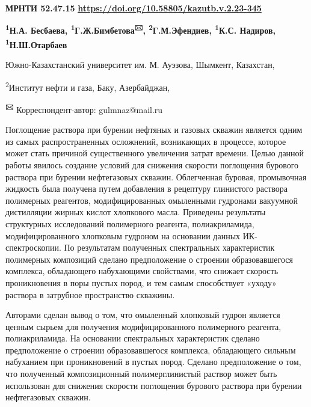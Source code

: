 \newpage
{\bfseries МРНТИ 52.47.15}
\hfill {\bfseries \href{https://doi.org/10.58805/kazutb.v.2.23-345}{https://doi.org/10.58805/kazutb.v.2.23-345}}


\begin{center}
{\bfseries \textsuperscript{1}Н.А. Бесбаева, \textsuperscript{1}Г.Ж.Бимбетова\textsuperscript{🖂}, \textsuperscript{2}Г.М.Эфендиев, \textsuperscript{1}К.С. Надиров, \textsuperscript{1}Н.Ш.Отарбаев}

Южно-Казахстанский университет им. М. Ауэзова, Шымкент, Казахстан,

\textsuperscript{2}Институт нефти и газа, Баку, Азербайджан,

{\bfseries \textsuperscript{🖂}} Корреспондент-автор: gulmnaz@mail.ru
\end{center}

Поглощение раствора при бурении нефтяных и газовых скважин является
одним из самых распространенных осложнений, возникающих в процессе,
которое может стать причиной существенного увеличения затрат времени.
Целью данной работы явилось создание условий для снижения скорости
поглощения бурового раствора при бурении нефтегазовых скважин.
Облегченная буровая, промывочная жидкость была получена путем добавления
в рецептуру глинистого раствора полимерных реагентов, модифицированных
омыленными гудронами вакуумной дистилляции жирных кислот хлопкового
масла. Приведены результаты структурных исследований полимерного
реагента, полиакриламида, модифицированного хлопковым гудроном на
основании данных ИК-спектроскопии. По результатам полученных
спектральных характеристик полимерных композиций сделано предположение о
строении образовавшегося комплекса, обладающего набухающими свойствами,
что снижает скорость проникновения в поры пустых пород, и тем самым
способствует «уходу» раствора в затрубное пространство скважины.

Авторами сделан вывод о том, что омыленный хлопковый гудрон является
ценным сырьем для получения модифицированного полимерного реагента,
полиакриламида. На основании спектральных характеристик сделано
предположение о строении образовавшегося комплекса, обладающего сильным
набуханием при проникновений в пустых пород. Сделано предположение о
том, что полученный композиционный полимерглинистый раствор может быть
использован для снижения скорости поглощения бурового раствора при
бурении нефтегазовых скважин.

